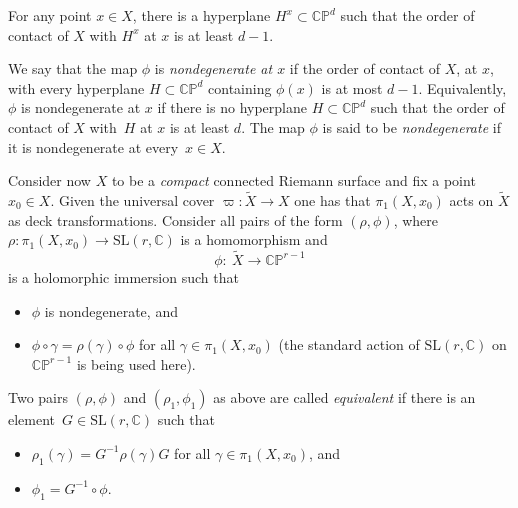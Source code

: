 \documentclass[10pt,a4paper]{amsart}
\numberwithin{equation}{section}
\begin{document}
For any point $x \in X$, there is a hyperplane $H^x \subset {\mathbb C}{\mathbb
P}^d$ such that the order of contact of $X$ with $H^x$ at $x$ is at least $d-1$.

\begin{Definition}We say that the map $\phi$ is \textit{nondegenerate at $x$} if the order of contact of $X$,
at $x$, with every hyperplane $H \subset {\mathbb C}{\mathbb P}^d$ containing $\phi(x)$
is at most $d-1$. Equivalently, $\phi$ is nondegenerate at $x$ if there is
no hyperplane $H \subset {\mathbb C}{\mathbb P}^d$ such that the
order of contact of $X$ with~$H$ at $x$ is at least $d$.
The map $\phi$ is said to be \textit{nondegenerate} if it is nondegenerate at every~$x \in X$.
\end{Definition}

Consider now $X$ to be a {\it compact} connected Riemann surface and fix a point $x_0 \in X$.
Given the universal cover
$
\varpi\colon \widetilde{X} \longrightarrow X
$
 one has that $\pi_1(X, x_0)$ acts on
$\widetilde{X}$ as deck transformations. Consider all pairs of the form
$(\rho, \phi)$, where
$
\rho\colon \pi_1(X, x_0) \longrightarrow \text{SL}(r, {\mathbb C})
$
is a homomorphism and
\[
\phi\colon\ \widetilde{X} \longrightarrow {\mathbb C}{\mathbb P}^{r-1}
\]
is a holomorphic immersion such that
\begin{itemize}\itemsep=0pt
\item[(1)] $\phi$ is nondegenerate, and

\item[(2)] $\phi\circ\gamma = \rho(\gamma)\circ\phi$ for all $\gamma \in
\pi_1(X, x_0)$ (the standard action of $\text{SL}(r, {\mathbb C})$
on ${\mathbb C}{\mathbb P}^{r-1}$ is being used here).
\end{itemize}

\begin{Definition}\label{space}Two pairs $(\rho, \phi)$ and $(\rho_1, \phi_1)$ as above are
 called \textit{equivalent} if there is an element~$G \in
\text{SL}(r, {\mathbb C})$ such that
\begin{itemize}\itemsep=0pt
\item[(1)] $\rho_1(\gamma) = G^{-1}\rho(\gamma) G$ for all
$\gamma \in \pi_1(X, x_0)$, and

\item[(2)] $\phi_1 = G^{-1}\circ\phi$.
\end{itemize}
\end{Definition}
\end{document}
